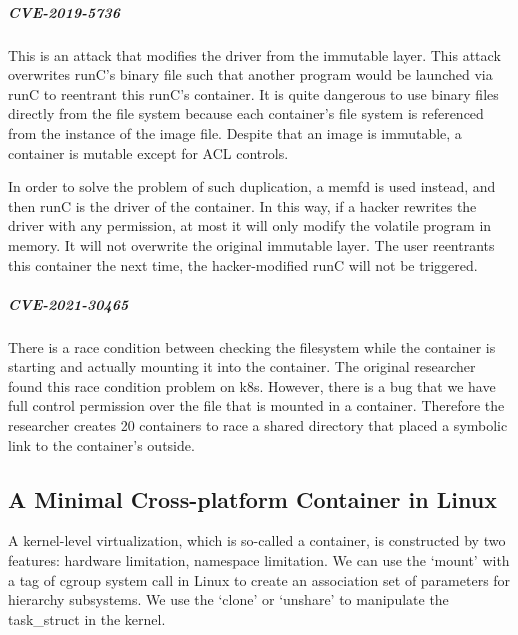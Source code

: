 \subparagraph{CVE-2019-5736}
This is an attack that modifies the driver from the immutable layer. This attack
overwrites runC's binary file such that another program would be launched via runC to
reentrant this runC's container. It is quite dangerous to use binary files directly
from the file system because each container's file system is referenced from the instance
of the image file. Despite that an image is immutable, a container is mutable except for ACL controls.

In order to solve the problem of such duplication, a memfd is used instead, and
then runC is the driver of the container. %
In this way, if a hacker rewrites the driver with any permission, at most it will only modify
the volatile program in memory. It will not overwrite the original immutable layer.
The user reentrants this container the next time, the hacker-modified runC will
not be triggered.

\subparagraph{CVE-2021-30465}
There is a race condition between checking the filesystem while the container is
starting and actually mounting it into the container. The original researcher found
this race condition problem on k8s. %
However, there is a bug that we have full control permission over the file that
is mounted in a container. Therefore the researcher creates 20 containers to race a shared
directory that placed a symbolic link to the container's outside.

% 


\subsection{A Minimal Cross-platform Container in Linux}
A kernel-level virtualization, which is so-called a container, is constructed by two
features: hardware limitation, namespace limitation. We can use the `mount' with a tag of
cgroup system call in Linux to create an association set of parameters for hierarchy
subsystems. %
We use the `clone' or `unshare' to manipulate the task\_struct in the kernel.


